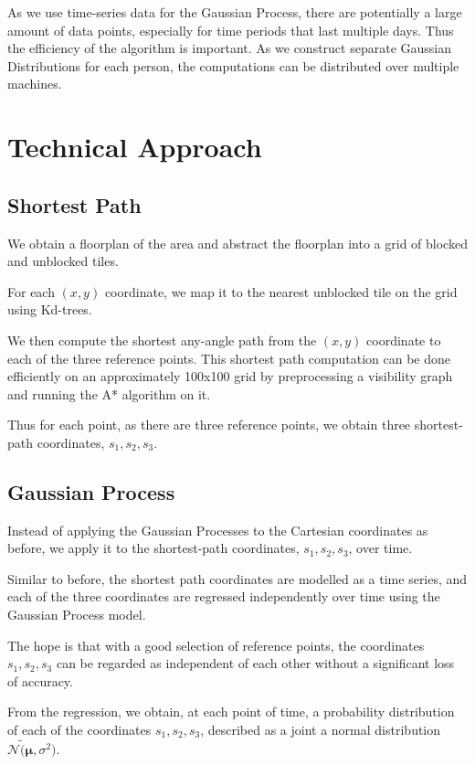 \documentclass[letterpaper]{article}
\begin{document}
As we use time-series data for the Gaussian Process, there are potentially a large amount of data points, especially for time periods that last multiple days. Thus the efficiency of the algorithm is important. As we construct separate Gaussian Distributions for each person, the computations can be distributed over multiple machines.


\section{Technical Approach}



\subsection{Shortest Path}

We obtain a floorplan of the area and abstract the floorplan into a grid of blocked and unblocked tiles.

For each $(x,y)$ coordinate, we map it to the nearest unblocked tile on the grid using Kd-trees.

We then compute the shortest any-angle path from the $(x,y)$ coordinate to each of the three reference points. This shortest path computation can be done efficiently on an approximately 100x100 grid by preprocessing a visibility graph and running the A* algorithm on it.

Thus for each point, as there are three reference points, we obtain three shortest-path coordinates, $s_1, s_2, s_3$.

\subsection{Gaussian Process}

Instead of applying the Gaussian Processes to the Cartesian coordinates as before, we apply it to the shortest-path coordinates, $s_1, s_2, s_3$, over time.

Similar to before, the shortest path coordinates are modelled as a time series, and each of the three coordinates are regressed independently over time using the Gaussian Process model.

The hope is that with a good selection of reference points, the coordinates $s_1, s_2, s_3$ can be regarded as independent of each other without a significant loss of accuracy.

From the regression, we obtain, at each point of time, a probability distribution of each of the coordinates $s_1, s_2, s_3$, described as a joint a normal distribution $\mathcal{N}\tilde (\boldsymbol{\mu},\sigma^2)$.
\end{document}
